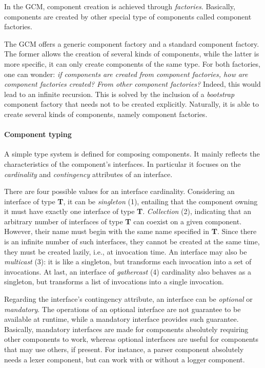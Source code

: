 		In the \ac{GCM}, component creation is achieved through \textit{factories}. Basically,	
	components are created by other special type of components called 
	component factories. 

		The \ac{GCM} offers a generic component factory and a standard component factory. 
	The former allows the creation of several kinds of components, while the latter is more
	specific, it can only create components of the same type.  %
	For both factories, one can wonder: \textit{if components are created from component factories,
	how are component factories created? From other component factories?} Indeed, this would lead
	to an infinite recursion. This is solved by the inclusion of a \textit{bootstrap} component factory 
	that needs not to be created explicitly. Naturally, it is able to create several kinds of components,
	namely component factories. 				
		
		
	\paragraph{Component typing}
	
			A simple type system is defined for composing components. It mainly reflects the characteristics
		of the component's interfaces. In particular it focuses on the \textit{cardinality} and \textit{contingency}
		attributes of an interface.	
					
			There are four possible values for an interface cardinality. Considering an interface of type \textbf{T}, 	
		it can be \textit{singleton} (1), entailing that the component owning it must have exactly one interface of
		type \textbf{T}. \textit{Collection} (2), indicating that an arbitrary number of interfaces of type \textbf{T}
		can coexist on a given component. However, their name must begin with the same name specified in \textbf{T}.
		Since there is an infinite number of such interfaces, they cannot be created at the same time, they must
		be created lazily, i.e., at invocation time. An interface may also be \textit{multicast} (3): it is like a singleton,
		but transforms each invocation into a set of invocations. At last, an interface of \textit{gathercast} (4) cardinality
		also behaves as a singleton, but transforms a list of invocations into a single invocation.
	    		
					
			Regarding the interface's contingency attribute, an interface can be \textit{optional} or \textit{mandatory}.
		The operations of an optional interface are not guarantee to be available at runtime, while a mandatory interface
		provides such guarantee. Basically, mandatory interfaces are made for components absolutely requiring other components
		to work, whereas optional interfaces are useful for components that may use others, if present. For instance,
		a parser component absolutely needs a lexer component, but can work with or without a logger component.
			
